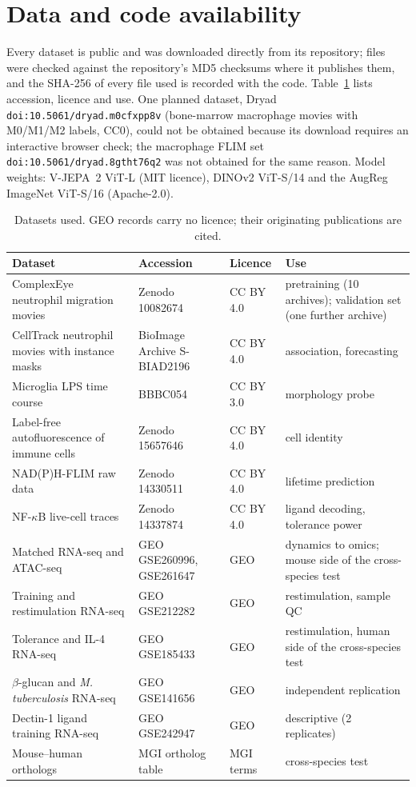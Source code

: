 \section*{Data and code availability}
\label{sec:data}
Every dataset is public and was downloaded directly from its repository; files were
checked against the repository's MD5 checksums where it publishes them, and the SHA-256 of
every file used is recorded with the code. Table~\ref{tab:data} lists accession, licence and
use. One planned dataset, Dryad \texttt{doi:10.5061/dryad.m0cfxpp8v} (bone-marrow macrophage
movies with M0/M1/M2 labels, CC0), could not be obtained because its download requires an
interactive browser check; the macrophage FLIM set \texttt{doi:10.5061/dryad.8gtht76q2} was
not obtained for the same reason. Model weights: V-JEPA~2 ViT-L (MIT licence), DINOv2
ViT-S/14 and the AugReg ImageNet ViT-S/16 (Apache-2.0). \CodeAvailability

\begin{table}[h]
\centering
\small
\caption{Datasets used. GEO records carry no licence; their originating publications are
cited.}
\label{tab:data}
\begin{tabular}{p{4.6cm}p{3.1cm}p{2.0cm}p{4.2cm}}
\toprule
Dataset & Accession & Licence & Use \\
\midrule
ComplexEye neutrophil migration movies \citep{complexeye} & Zenodo 10082674 & CC BY 4.0 &
pretraining (10 archives); validation set (one further archive) \\
CellTrack neutrophil movies with instance masks & BioImage Archive S-BIAD2196 & CC BY 4.0 &
association, forecasting \\
Microglia LPS time course \citep{bbbc} & BBBC054 & CC BY 3.0 & morphology probe \\
Label-free autofluorescence of immune cells \citep{kreiss2026cellmics} & Zenodo 15657646 &
CC BY 4.0 & cell identity \\
NAD(P)H-FLIM raw data \citep{musimbi2025flim} & Zenodo 14330511 & CC BY 4.0 & lifetime
prediction \\
NF-\(\kappa\)B live-cell traces \citep{wang2025} & Zenodo 14337874 & CC BY 4.0 & ligand decoding,
tolerance power \\
Matched RNA-seq and ATAC-seq \citep{wang2025} & GEO GSE260996, GSE261647 & GEO & dynamics to
omics; mouse side of the cross-species test \\
Training and restimulation RNA-seq \citep{ferreira2023} & GEO GSE212282 & GEO &
restimulation, sample QC \\
Tolerance and IL-4 RNA-seq \citep{schrijver2023} & GEO GSE185433 & GEO & restimulation, human
side of the cross-species test \\
\(\beta\)-glucan and \emph{M. tuberculosis} RNA-seq \citep{moorlag2020} & GEO GSE141656 & GEO &
independent replication \\
Dectin-1 ligand training RNA-seq \citep{cheng2024dectin} & GEO GSE242947 & GEO & descriptive
(2 replicates) \\
Mouse--human orthologs \citep{mgi} & MGI ortholog table & MGI terms & cross-species
test \\
\bottomrule
\end{tabular}
\end{table}
